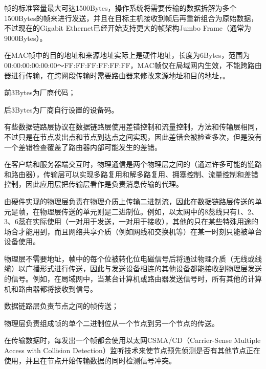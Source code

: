 帧的标准容量最大可达1500Bytes，操作系统将需要传输的数据拆解为多个1500Bytes的帧来进行发送，并且在目标主机接收到帧后再重新组合为原始数据，不过现在的Gigabit Ethernet已经开始支持更大的帧架构Jumbo Frame（通常为9000Bytes）。

在MAC帧中的目的地址和来源地址实际上是硬件地址，长度为6Bytes，范围为00:00:00:00:00:00～FF:FF:FF:FF:FF:FF，MAC帧仅在局域网内生效，不能跨路由器进行传输，在跨网段传输时需要路由器来修改来源地址和目的地址，。

\begin{compactitem}
\item 前3Bytes为厂商代码；
\item 后3Bytes为厂商自行设置的设备码。
\end{compactitem}



有些数据链路层协议在数据链路层使用差错控制和流量控制，方法和传输层相同，不过只是在节点发出点和节点到达点之间实现，因此差错会被检查多次，但是没有一个差错检查覆盖了路由器内部可能发生的差错。

在客户端和服务器端交互时，物理通信是两个物理层之间的（通过许多可能的链路和路由器），传输层可以实现多路复用和解多路复用、拥塞控制、流量控制和差错控制，因此应用层把传输层看作是负责消息传输的代理。

由硬件实现的物理层负责在物理介质上传输二进制流，因此在数据链路层传送的单元是帧，在物理层传送的单元则是二进制位。例如，以太网中的8蕊线只有1、2、3、6蕊在实际使用（一对用于发送，一对用于接收），其他的只在某些特殊用途的场合才能用到，而且网络共享介质（例如网线和交换机等）在某一时刻只能被单台设备使用。





物理层不需要地址，帧中的每个位被转化位电磁信号后将通过物理介质（无线或线缆）以广播形式进行传送，因此与发送设备相连的其他设备都能接收到物理层发送的信号。例如，在局域网中，当某台计算机或路由器发送信号时，所有其他的计算机和路由器都将接收到信号。

\begin{compactitem}
\item 数据链路层负责节点之间的帧传送；
\item 物理层负责组成帧的单个二进制位从一个节点到另一个节点的传送。
\end{compactitem}

在传输数据时，每发出一个帧都会使用以太网CSMA/CD（Carrier-Sense Multiple Access with Collision Detection）监听技术来使节点预先侦测是否有其他节点正在使用，并且在节点开始传输数据的同时检测信号冲突。

